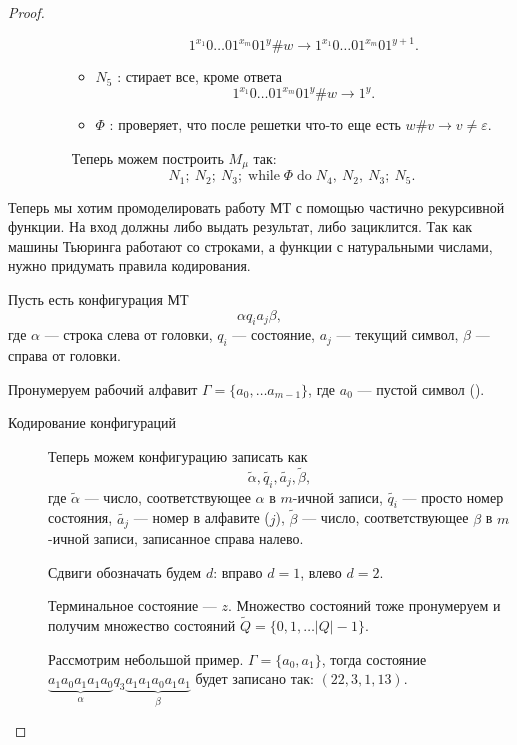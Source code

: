 \begin{proof}
\begin{description}
\begin{itemize}
\begin{description}
\begin{itemize}
									\[
1^{x_1}0\ldots 01^{x_{m}}01^{y} \# w \longrightarrow 
1^{x_1}0\ldots 01^{x_{m}}01^{y+1}
									.\] 
								\item $ N_5$ : стирает  все, кроме ответа
									\[
1^{x_1}0\ldots 01^{x_{m}}01^{y} \# w \longrightarrow 1^{y}
									.\] 
								\item $ \Phi $ : проверяет, что после решетки что-то еще есть
									$ w\# v \longrightarrow v \ne \varepsilon $.
							\end{itemize}
							Теперь можем построить $ M_{\mu}$ так: 
							\[
								N_1; ~ N_2; ~ N_3; \operatorname{while} \Phi \operatorname{do} N_4, ~ N_2, ~ N_3; ~ N_5
							.\] 
					\end{description}
			\end{itemize}
        \item {} 
			Теперь мы хотим промоделировать работу МТ с помощью частично рекурсивной функции. На вход должны либо выдать результат, либо зациклится. 
			Так как машины Тьюринга работают со строками, а функции с натуральными числами, нужно придумать правила кодирования.

			Пусть есть конфигурация МТ 
			$$ \alpha q_i a_j \beta ,$$ где $ \alpha $ --- строка слева от головки, $ q_i$ --- состояние, $ a_j$ --- текущий символ, $ \beta $ --- справа от головки.

			Пронумеруем рабочий алфавит $ \Gamma = \{a_0, \ldots a_{m-1}\}$, где $ a_0$ --- пустой символ (\textvisiblespace).

			\begin{description}
				\item[Кодирование конфигураций]
			Теперь можем конфигурацию записать как 
			 \[
				 \widetilde{ \alpha } , \widetilde{ q_i} , \widetilde{ a_j} , \widetilde{ \beta } 
			,\] 
			где $ \widetilde{ \alpha } $ --- число, соответствующее $ \alpha $  в $  m$-ичной записи, $ \widetilde{ q_i} $ --- просто номер состояния, $ \widetilde{ a_j} $ --- номер  в алфавите ($ j$), $ \widetilde{ \beta } $ --- число, соответствующее $ \beta $ в $ m$-ичной записи, записанное справа налево. 

			Сдвиги обозначать будем $ d$: вправо  $d= 1$, влево $ d= 2$.

			Терминальное состояние --- $ z$. 
			Множество состояний тоже пронумеруем и получим множество состояний $ \widetilde{ Q}  = \{0, 1, \ldots \lvert Q \rvert - 1\}$.

			\begin{ex}
			    Рассмотрим небольшой пример. $ \Gamma = \{a_0, a_1\}$, тогда состояние 
				$
					\underbrace{a_1a_0a_1a_1a_0}_{ \alpha } q_3 \underbrace{a_1 a_1 a_0 a_1a_1}_{ \beta }
					$
				будет записано так:
				$
					(22, 3, 1, 13)
					$.
			\end{ex}


\end{description}
\end{description}
\end{proof}
